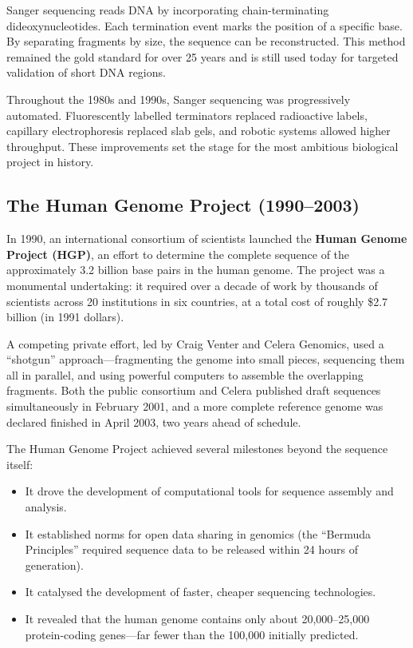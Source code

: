 \begin{keyconcept}[title={Sanger Sequencing}]
Sanger sequencing reads DNA by incorporating chain-terminating dideoxynucleotides. Each termination event marks the position of a specific base. By separating fragments by size, the sequence can be reconstructed. This method remained the gold standard for over 25 years and is still used today for targeted validation of short DNA regions.
\end{keyconcept}

Throughout the 1980s and 1990s, Sanger sequencing was progressively automated. Fluorescently labelled terminators replaced radioactive labels, capillary electrophoresis replaced slab gels, and robotic systems allowed higher throughput. These improvements set the stage for the most ambitious biological project in history.

\subsection{The Human Genome Project (1990--2003)}
\label{subsec:intro:hgp}

In 1990, an international consortium of scientists launched the \textbf{Human Genome Project (HGP)}, an effort to determine the complete sequence of the approximately 3.2 billion base pairs in the human genome. The project was a monumental undertaking: it required over a decade of work by thousands of scientists across 20 institutions in six countries, at a total cost of roughly \$2.7 billion (in 1991 dollars).

A competing private effort, led by Craig Venter and Celera Genomics, used a ``shotgun'' approach---fragmenting the genome into small pieces, sequencing them all in parallel, and using powerful computers to assemble the overlapping fragments. Both the public consortium and Celera published draft sequences simultaneously in February 2001, and a more complete reference genome was declared finished in April 2003, two years ahead of schedule.

The Human Genome Project achieved several milestones beyond the sequence itself:
\begin{itemize}[itemsep=2pt]
  \item It drove the development of computational tools for sequence assembly and analysis.
  \item It established norms for open data sharing in genomics (the ``Bermuda Principles'' required sequence data to be released within 24 hours of generation).
  \item It catalysed the development of faster, cheaper sequencing technologies.
  \item It revealed that the human genome contains only about 20,000--25,000 protein-coding genes---far fewer than the 100,000 initially predicted.
\end{itemize}

